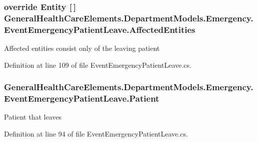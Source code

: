 \subsubsection[{\texorpdfstring{Affected\+Entities}{AffectedEntities}}]{\setlength{\rightskip}{0pt plus 5cm}override {\bf Entity} \mbox{[}$\,$\mbox{]} General\+Health\+Care\+Elements.\+Department\+Models.\+Emergency.\+Event\+Emergency\+Patient\+Leave.\+Affected\+Entities\hspace{0.3cm}{\ttfamily [get]}}\hypertarget{class_general_health_care_elements_1_1_department_models_1_1_emergency_1_1_event_emergency_patient_leave_ad4518aba192cbebb17419e0780389b5b}{}\label{class_general_health_care_elements_1_1_department_models_1_1_emergency_1_1_event_emergency_patient_leave_ad4518aba192cbebb17419e0780389b5b}


Affected entities consist only of the leaving patient 



Definition at line 109 of file Event\+Emergency\+Patient\+Leave.\+cs.

\subsubsection[{\texorpdfstring{Patient}{Patient}}]{ General\+Health\+Care\+Elements.\+Department\+Models.\+Emergency.\+Event\+Emergency\+Patient\+Leave.\+Patient\hspace{0.3cm}{\ttfamily [get]}}\hypertarget{class_general_health_care_elements_1_1_department_models_1_1_emergency_1_1_event_emergency_patient_leave_a017d5d979a92db776957e2cb10223a2d}{}\label{class_general_health_care_elements_1_1_department_models_1_1_emergency_1_1_event_emergency_patient_leave_a017d5d979a92db776957e2cb10223a2d}


Patient that leaves 



Definition at line 94 of file Event\+Emergency\+Patient\+Leave.\+cs.

